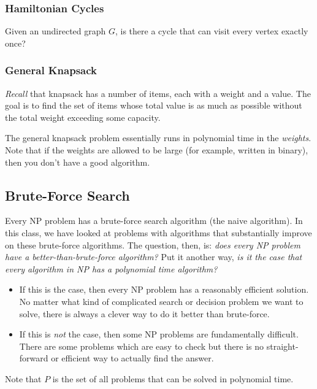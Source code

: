 \documentclass[letterpaper]{article}
\begin{document}
\subsubsection{Hamiltonian Cycles}
Given an undirected graph $G$, is there a cycle that can visit every vertex exactly once? 

\subsubsection{General Knapsack}
\emph{Recall} that knapsack has a number of items, each with a weight and a value. The goal is to find the set of items whose total value is as much as possible without the total weight exceeding some capacity. 

\bigskip 

The general knapsack problem essentially runs in polynomial time in the \emph{weights}. Note that if the weights are allowed to be large (for example, written in binary), then you don't have a good algorithm. 


\subsection{Brute-Force Search}
Every NP problem has a brute-force search algorithm (the naive algorithm). In this class, we have looked at problems with algorithms that substantially improve on these brute-force algorithms. The question, then, is: \emph{does every NP problem have a better-than-brute-force algorithm?} Put it another way, \emph{is it the case that every algorithm in NP has a polynomial time algorithm?} 
\begin{itemize}
    \item If this is the case, then every NP problem has a reasonably efficient solution. No matter what kind of complicated search or decision problem we want to solve, there is always a clever way to do it better than brute-force. 
    \item If this is \emph{not} the case, then some NP problems are fundamentally difficult. There are some problems which are easy to check but there is no straight-forward or efficient way to actually find the answer.  
\end{itemize}
Note that $P$ is the set of all problems that can be solved in polynomial time. 
\end{document}
